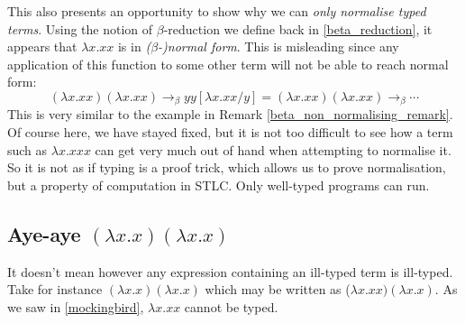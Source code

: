 \begin{remark}
    This also presents an opportunity to show why we can \emph{only normalise typed terms}. Using the notion of $\beta$-reduction we define back in \ref{beta_reduction}, it appears that $\lambda x . x x$ is in \emph{($\beta$-)normal form}. This is misleading since any application of this function to some other term will not be able to reach normal form:
    \begin{equation*}
        (\lambda x. x x)(\lambda x . x x) \to_{\beta} y y [\lambda x . x x / y] = (\lambda x . x x)(\lambda x . x x) \to_{\beta} \cdots
    \end{equation*}
    This is very similar to the example in Remark \ref{beta_non_normalising_remark}. Of course here, we have stayed fixed, but it is not too difficult to see how a term such as $\lambda x . x x x$ can get very much out of hand when attempting to normalise it.
    So it is not as if typing is a proof trick, which allows us to prove normalisation, but a property of computation in STLC. Only well-typed programs can run.
\end{remark}

\subsection{Aye-aye \texorpdfstring{$(\lambda x . x)(\lambda x . x)$}{}} %

It doesn't mean however any expression containing an ill-typed term is ill-typed. Take for instance $(\lambda x . x)( \lambda x . x)$ which may be written as ($\lambda x . x x) (\lambda x . x)$. As we saw in \ref{mockingbird}, $\lambda x . x x$ cannot be typed.

